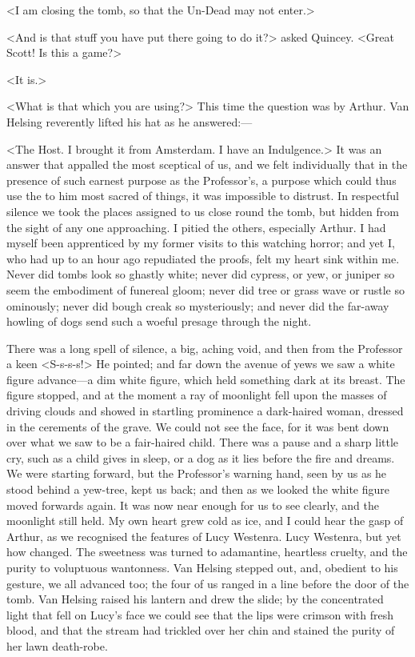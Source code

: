 <I am closing the tomb, so that the Un-Dead may not enter.>

<And is that stuff you have put there going to do it?> asked Quincey. <Great Scott! Is this a game?>

<It is.>

<What is that which you are using?> This time the question was by Arthur. Van Helsing reverently lifted his hat as he answered:—

<The Host. I brought it from Amsterdam. I have an Indulgence.> It was an answer that appalled the most sceptical of us, and we felt individually that in the presence of such earnest purpose as the Professor's, a purpose which could thus use the to him most sacred of things, it was impossible to distrust. In respectful silence we took the places assigned to us close round the tomb, but hidden from the sight of any one approaching. I pitied the others, especially Arthur. I had myself been apprenticed by my former visits to this watching horror; and yet I, who had up to an hour ago repudiated the proofs, felt my heart sink within me. Never did tombs look so ghastly white; never did cypress, or yew, or juniper so seem the embodiment of funereal gloom; never did tree or grass wave or rustle so ominously; never did bough creak so mysteriously; and never did the far-away howling of dogs send such a woeful presage through the night.

There was a long spell of silence, a big, aching void, and then from the Professor a keen <S-s-s-s!> He pointed; and far down the avenue of yews we saw a white figure advance—a dim white figure, which held something dark at its breast. The figure stopped, and at the moment a ray of moonlight fell upon the masses of driving clouds and showed in startling prominence a dark-haired woman, dressed in the cerements of the grave. We could not see the face, for it was bent down over what we saw to be a fair-haired child. There was a pause and a sharp little cry, such as a child gives in sleep, or a dog as it lies before the fire and dreams. We were starting forward, but the Professor's warning hand, seen by us as he stood behind a yew-tree, kept us back; and then as we looked the white figure moved forwards again. It was now near enough for us to see clearly, and the moonlight still held. My own heart grew cold as ice, and I could hear the gasp of Arthur, as we recognised the features of Lucy Westenra. Lucy Westenra, but yet how changed. The sweetness was turned to adamantine, heartless cruelty, and the purity to voluptuous wantonness. Van Helsing stepped out, and, obedient to his gesture, we all advanced too; the four of us ranged in a line before the door of the tomb. Van Helsing raised his lantern and drew the slide; by the concentrated light that fell on Lucy's face we could see that the lips were crimson with fresh blood, and that the stream had trickled over her chin and stained the purity of her lawn death-robe.

